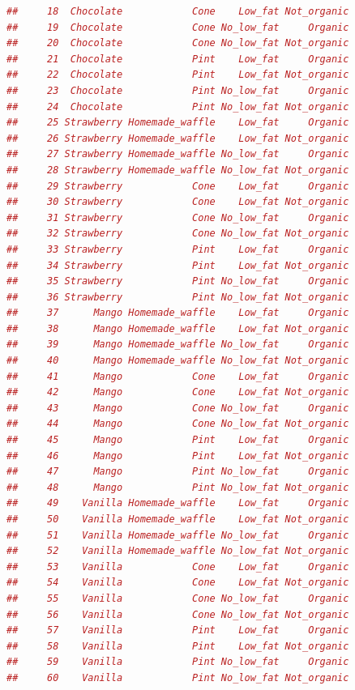 \documentclass{article}
\begin{document}
\begin{lstlisting}[language=R]
##     18  Chocolate            Cone    Low_fat Not_organic
##     19  Chocolate            Cone No_low_fat     Organic
##     20  Chocolate            Cone No_low_fat Not_organic
##     21  Chocolate            Pint    Low_fat     Organic
##     22  Chocolate            Pint    Low_fat Not_organic
##     23  Chocolate            Pint No_low_fat     Organic
##     24  Chocolate            Pint No_low_fat Not_organic
##     25 Strawberry Homemade_waffle    Low_fat     Organic
##     26 Strawberry Homemade_waffle    Low_fat Not_organic
##     27 Strawberry Homemade_waffle No_low_fat     Organic
##     28 Strawberry Homemade_waffle No_low_fat Not_organic
##     29 Strawberry            Cone    Low_fat     Organic
##     30 Strawberry            Cone    Low_fat Not_organic
##     31 Strawberry            Cone No_low_fat     Organic
##     32 Strawberry            Cone No_low_fat Not_organic
##     33 Strawberry            Pint    Low_fat     Organic
##     34 Strawberry            Pint    Low_fat Not_organic
##     35 Strawberry            Pint No_low_fat     Organic
##     36 Strawberry            Pint No_low_fat Not_organic
##     37      Mango Homemade_waffle    Low_fat     Organic
##     38      Mango Homemade_waffle    Low_fat Not_organic
##     39      Mango Homemade_waffle No_low_fat     Organic
##     40      Mango Homemade_waffle No_low_fat Not_organic
##     41      Mango            Cone    Low_fat     Organic
##     42      Mango            Cone    Low_fat Not_organic
##     43      Mango            Cone No_low_fat     Organic
##     44      Mango            Cone No_low_fat Not_organic
##     45      Mango            Pint    Low_fat     Organic
##     46      Mango            Pint    Low_fat Not_organic
##     47      Mango            Pint No_low_fat     Organic
##     48      Mango            Pint No_low_fat Not_organic
##     49    Vanilla Homemade_waffle    Low_fat     Organic
##     50    Vanilla Homemade_waffle    Low_fat Not_organic
##     51    Vanilla Homemade_waffle No_low_fat     Organic
##     52    Vanilla Homemade_waffle No_low_fat Not_organic
##     53    Vanilla            Cone    Low_fat     Organic
##     54    Vanilla            Cone    Low_fat Not_organic
##     55    Vanilla            Cone No_low_fat     Organic
##     56    Vanilla            Cone No_low_fat Not_organic
##     57    Vanilla            Pint    Low_fat     Organic
##     58    Vanilla            Pint    Low_fat Not_organic
##     59    Vanilla            Pint No_low_fat     Organic
##     60    Vanilla            Pint No_low_fat Not_organic
\end{lstlisting}
\end{document}
